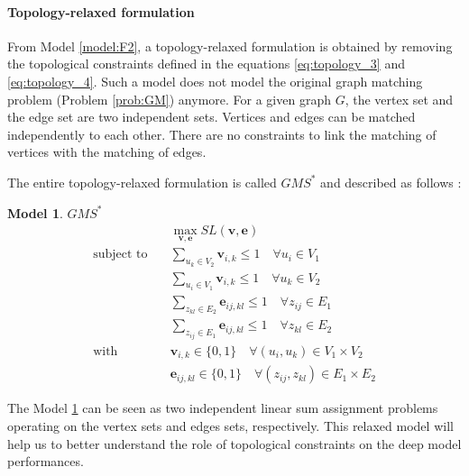 \documentclass[times,onecolumn,final,authoryear]{article}
\theoremstyle{definition}
\newtheorem{model}{Model}
\begin{document}
\paragraph{Topology-relaxed formulation}
From Model \ref{model:F2}, a topology-relaxed formulation is obtained by removing the topological constraints defined in the equations \eqref{eq:topology_3} and \eqref{eq:topology_4}. Such a model does not model the original graph matching problem (Problem \ref{prob:GM}) anymore. For a given graph $G$, the vertex set and the edge set are two independent sets. Vertices and edges can be matched independently to each other. There are no constraints to link the matching of vertices with the matching of edges. 

The entire topology-relaxed formulation is called $GMS^*$ and described as follows : 
\begin{model}{$GMS^*$}
\begin{subequations}
    \begin{align}
        &\max_{{\mathbf{v},\mathbf{e}}} SL(\mathbf{v},\mathbf{e}) \\
    \text{subject to}\quad
    &\sum_{u_k \in V_2} \textbf{v}_{i,k}  \leq 1 \quad \forall u_i \in V_1 \\
    &\sum_{u_i \in V_1} \textbf{v}_{i,k}  \leq 1 \quad \forall u_k \in V_2 \\
    &\sum_{z_{kl} \in E_2} \textbf{e}_{ij,kl}  \leq 1 \quad \forall z_{ij} \in E_1\\
    &\sum_{z_{ij} \in E_1} \textbf{e}_{ij,kl}  \leq 1 \quad \forall z_{kl} \in E_2 \\
    \text{with}\quad
    &\mathbf{v}_{i,k} \in \{0, 1\} \quad \forall (u_i, u_k) \in V_1 \times V_2\\
    &\mathbf{e}_{ij,kl} \in \{0, 1\} \quad \forall (z_{ij}, z_{kl}) \in E_1 \times E_2
  \end{align}
\end{subequations}
\label{model:F2degraded}
\end{model}

The Model \ref{model:F2degraded} can be seen as two independent linear sum assignment problems operating on the vertex sets and edges sets, respectively. This relaxed model will help us to better understand the role of topological constraints on the deep model performances.
\end{document}

